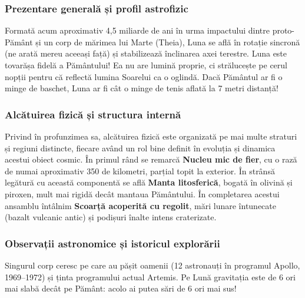 \subsubsection*{Prezentare generală și profil astrofizic}
Formată acum aproximativ 4,5 miliarde de ani în urma impactului dintre proto-Pământ și un corp de mărimea lui Marte (Theia), Luna se află în rotație sincronă (ne arată mereu aceeași față) și stabilizează înclinarea axei terestre. Luna este tovarășa fidelă a Pământului! Ea nu are lumină proprie, ci strălucește pe cerul nopții pentru că reflectă lumina Soarelui ca o oglindă. Dacă Pământul ar fi o minge de baschet, Luna ar fi cât o minge de tenis aflată la 7 metri distanță!

\subsubsection*{Alcătuirea fizică și structura internă}
Privind în profunzimea sa, alcătuirea fizică este organizată pe mai multe straturi și regiuni distincte, fiecare având un rol bine definit în evoluția și dinamica acestui obiect cosmic. În primul rând se remarcă \textbf{Nucleu mic de fier}, cu o rază de numai aproximativ 350 de kilometri, parțial topit la exterior. În strânsă legătură cu această componentă se află \textbf{Manta litosferică}, bogată în olivină și piroxen, mult mai rigidă decât mantaua Pământului. În completarea acestui ansamblu întâlnim \textbf{Scoarță acoperită cu regolit}, mări lunare întunecate (bazalt vulcanic antic) și podișuri înalte intens craterizate.

\subsubsection*{Observații astronomice și istoricul explorării}
Singurul corp ceresc pe care au pășit oamenii (12 astronauți în programul Apollo, 1969--1972) și ținta programului actual Artemis. Pe Lună gravitația este de 6 ori mai slabă decât pe Pământ: acolo ai putea sări de 6 ori mai sus!

